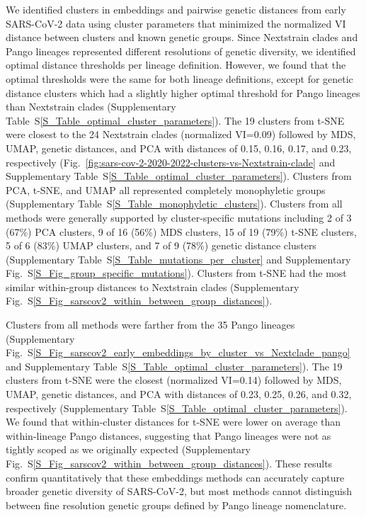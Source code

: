\documentclass[webpdf,contemporary,large,single]{oup-authoring-template}%
\theoremstyle{thmstyleone}%
\theoremstyle{thmstyletwo}%
\theoremstyle{thmstylethree}%
\begin{document}
We identified clusters in embeddings and pairwise genetic distances from early SARS-CoV-2 data using cluster parameters that minimized the normalized VI distance between clusters and known genetic groups.
Since Nextstrain clades and Pango lineages represented different resolutions of genetic diversity, we identified optimal distance thresholds per lineage definition.
However, we found that the optimal thresholds were the same for both lineage definitions, except for genetic distance clusters which had a slightly higher optimal threshold for Pango lineages than Nextstrain clades (Supplementary Table~S\ref{S_Table_optimal_cluster_parameters}).
The 19 clusters from t-SNE were closest to the 24 Nextstrain clades (normalized VI=0.09) followed by MDS, UMAP, genetic distances, and PCA with distances of 0.15, 0.16, 0.17, and 0.23, respectively (Fig.~\ref{fig:sars-cov-2-2020-2022-clusters-vs-Nextstrain-clade} and Supplementary Table~S\ref{S_Table_optimal_cluster_parameters}).
Clusters from PCA, t-SNE, and UMAP all represented completely monophyletic groups (Supplementary Table~S\ref{S_Table_monophyletic_clusters}).
Clusters from all methods were generally supported by cluster-specific mutations including 2 of 3 (67\%) PCA clusters, 9 of 16 (56\%) MDS clusters, 15 of 19 (79\%) t-SNE clusters, 5 of 6 (83\%) UMAP clusters, and 7 of 9 (78\%) genetic distance clusters (Supplementary Table~S\ref{S_Table_mutations_per_cluster} and Supplementary Fig.~S\ref{S_Fig_group_specific_mutations}).
Clusters from t-SNE had the most similar within-group distances to Nextstrain clades (Supplementary Fig.~S\ref{S_Fig_sarscov2_within_between_group_distances}).

Clusters from all methods were farther from the 35 Pango lineages (Supplementary Fig.~S\ref{S_Fig_sarscov2_early_embeddings_by_cluster_vs_Nextclade_pango} and Supplementary Table~S\ref{S_Table_optimal_cluster_parameters}).
The 19 clusters from t-SNE were the closest (normalized VI=0.14) followed by MDS, UMAP, genetic distances, and PCA with distances of 0.23, 0.25, 0.26, and 0.32, respectively (Supplementary Table~S\ref{S_Table_optimal_cluster_parameters}).
We found that within-cluster distances for t-SNE were lower on average than within-lineage Pango distances, suggesting that Pango lineages were not as tightly scoped as we originally expected (Supplementary Fig.~S\ref{S_Fig_sarscov2_within_between_group_distances}).
These results confirm quantitatively that these embeddings methods can accurately capture broader genetic diversity of SARS-CoV-2, but most methods cannot distinguish between fine resolution genetic groups defined by Pango lineage nomenclature.
\end{document}
